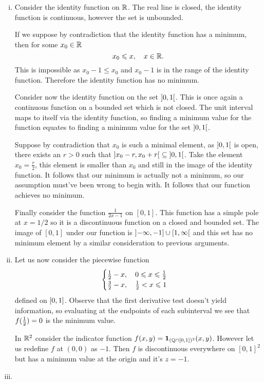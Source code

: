 \documentclass[12pt]{memoir}
\begin{document}
\begin{ptcbr}
\begin{enumerate}[i)]
    \itemsep=-0.4em
    \item Consider the identity function on $\mathbb{R}$. The real line is closed, the identity function is continuous, however the set is unbounded.\par 
    If we suppose by contradiction that the identity function has a minimum, then for some $x_0\in\mathbb{R}$ 
    $$x_0\leqslant x,\quad x\in\mathbb{R}.$$
    This is impossible as $x_0-1\leq x_0$ and $x_0-1$ is in the range of the identity function. Therefore the identity function has no minimum.\par
    Consider now the identity function on the set $\left\rbrack0,1\right\lbrack$. This is once again a continuous function on a bounded set which is not closed. The unit interval maps to itself via the identity function, so finding a minimum value for the function equates to finding a minimum value for the set $\left\rbrack0,1\right\lbrack$.\par 
    Suppose by contradiction that $x_0$ is such a minimal element, as $\left\rbrack0,1\right\lbrack$ is open, there exists an $r>0$ such that $\left\rbrack x_0-r,x_0+r\right\lbrack\subseteq\left\rbrack0,1\right\lbrack$. Take the element $x_0=\frac{r}{2}$, this element is smaller than $x_0$ and still in the image of the identity function. It follows that our minimum is actually not a minimum, so our assumption must've been wrong to begin with. It follows that our function achieves no minimum.\par
    Finally consider the function $\frac{1}{2x-1}$ on $[0,1]$. This function has a simple pole at $x=1/2$ so it is a discontinuous function on a closed and bounded set. The image of $[0,1]$ under our function is $\left\rbrack-\infty,-1\right\rbrack\cup\left\lbrack1,\infty\right\lbrack$ and this set has no minimum element by a similar consideration to previous arguments.
    \item Let us now consider the piecewise function 
    $$\begin{cases}
        \half-x,\quad 0\leq x\leq\half\\
        \frac32-x,\quad \half<x\leq1
    \end{cases}$$
    defined on $\left\lbrack0,1\right\rbrack$. Observe that the first derivative test doesn't yield information, so evaluating at the endpoints of each subinterval we see that $f(\half)=0$ is the minimum value.\par 
    In $\mathbb{R}^2$ consider the indicator function $f(x,y)=\mathbf{1}_{(\mathbb{Q}\cap\left\lbrack0,1\right\rbrack)^2}(x,y)$. However let us redefine $f$ at $(0,0)$ as $-1$. Then $f$ is discontinuous everywhere on $[0,1]^2$ but has a minimum value at the origin and it's $z=-1$.
    \item 
\end{enumerate}
\end{ptcbr}
\end{document}
